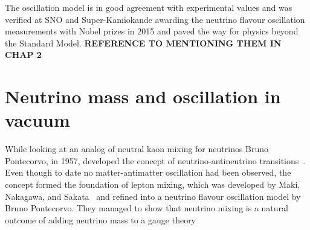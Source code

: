 The oscillation model is in good agreement with experimental values and was verified at SNO and Super-Kamiokande awarding the neutrino flavour oscillation measurements with Nobel prizes in 2015 and paved the way for physics beyond the Standard Model. \textbf{REFERENCE TO MENTIONING THEM IN CHAP 2}

\section{Neutrino mass and oscillation in vacuum}\label{subsection:Neutrinomassandoscillation}
While looking at an analog of neutral kaon mixing for neutrinos Bruno Pontecorvo, in 1957, developed the concept of neutrino-antineutrino transitions~\cite{11Pontecorvo}. Even though to date no matter-antimatter oscillation had been observed, the concept formed the foundation of lepton mixing, which was developed by Maki, Nakagawa, and Sakata~\cite{12Maki} and refined into a neutrino flavour oscillation model by Bruno Pontecorvo. They managed to show that neutrino mixing is a natural outcome of adding neutrino mass to a gauge theory~\cite{11Pontecorvo}

